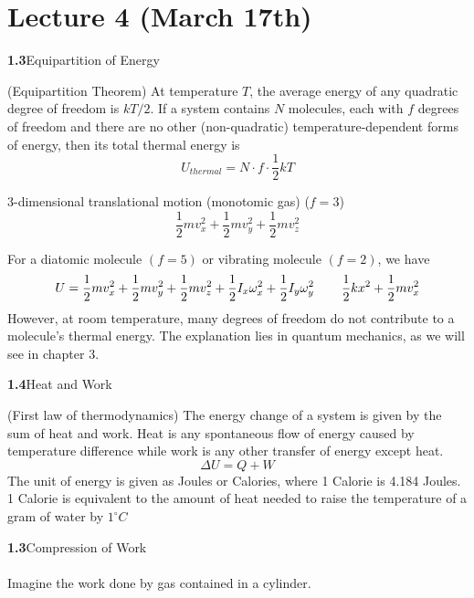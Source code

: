 \section{Lecture 4 (March 17th)}
{\bf 1.3}\hspace{2ex}Equipartition of Energy
\\
\begin{thm}
(Equipartition Theorem) At temperature $T$, the average energy of any quadratic degree of freedom is $kT/2$. If a system contains $N$ molecules, each with $f$ degrees of freedom and there are no other (non-quadratic) temperature-dependent forms of energy, then its total thermal energy is
\[U_{thermal}=N\cdot f\cdot \dfrac{1}{2}kT\]
\end{thm}
\vspace{2ex}
\begin{ex}
3-dimensional translational motion (monotomic gas) ($f=3$)
\[\dfrac{1}{2}mv^2_{x}+\dfrac{1}{2}mv^2_{y}+\dfrac{1}{2}mv^2_{z}\]
\end{ex}
\vspace{2ex}
\begin{ex}
For a diatomic molecule $(f=5)$ or vibrating molecule $(f=2)$, we have
\[U=\dfrac{1}{2}mv_{x}^2+\dfrac{1}{2}mv_{y}^2+\dfrac{1}{2}mv_{z}^2+\dfrac{1}{2}I_{x}\omega_{x} ^2+\dfrac{1}{2}I_{y}\omega_{y} ^2\hspace{5ex}\dfrac{1}{2}kx^2+\dfrac{1}{2}mv_{x}^2\]
However, at room temperature, many degrees of freedom do not contribute to a molecule's thermal energy. The explanation lies in quantum mechanics, as we will see in chapter 3.
\end{ex}
\vspace{2ex}
{\bf 1.4}\hspace{2ex}Heat and Work
\\
\begin{thm}
(First law of thermodynamics) The energy change of a system is given by the sum of heat and work. Heat is any spontaneous flow of energy caused by temperature difference while work is any other transfer of energy except heat.
\[\Delta U=Q+W\]
The unit of energy is given as Joules or Calories, where 1 Calorie is 4.184 Joules. 1 Calorie is equivalent to the amount of heat needed to raise the temperature of a gram of water by $1^{\circ}C$
\end{thm}
\vspace{2ex}
{\bf 1.3}\hspace{2ex}Compression of Work
\\\\
Imagine the work done by gas contained in a cylinder.
